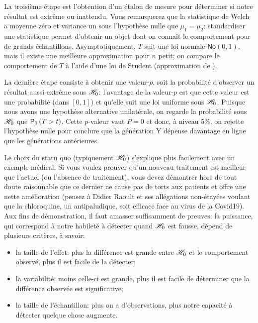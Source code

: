 \documentclass[
  11pt,
  letterpaper,
]{book}
\providecommand{\tightlist}{%
  \setlength{\itemsep}{0pt}\setlength{\parskip}{0pt}}
\begin{document}
La troisième étape est l'obtention d'un étalon de mesure pour déterminer si notre résultat est extrême ou inattendu. Vous remarquerez que la statistique de Welch a moyenne zéro et variance un sous l'hypothèse nulle que \(\mu_1=\mu_2\): standardiser une statistique permet d'obtenir un objet dont on connaît le comportement pour de grands échantillons.
Asymptotiquement, \(T\) suit une loi normale \(\mathsf{No}(0, 1)\), mais il existe une meilleure approximation pour \(n\) petit; on compare le comportement de \(T\) à l'aide d'une loi de Student (approximation de \citet{Satterthwaite:1946}).

La dernière étape consiste à obtenir une valeur-\(p\), soit la probabilité d'observer un résultat aussi extrême sous \(\Hy_0\): l'avantage de la valeur-\(p\) est que cette valeur est une probabilité (dans \([0, 1]\)) et qu'elle suit une loi uniforme sous \(\Hy_0\). Puisque nous avons une hypothèse alternative unilatérale, on regarde la probabilité sous \(\Hy_0\) que \(\pr[0]{T > t}\). Cette \(p\)-valeur vaut \(P=0\) et donc, à niveau 5\%, on rejette l'hypothèse nulle pour conclure que la génération Y dépense davantage en ligne que les générations antérieures.

Le choix du statu quo (typiquement \(\Hy_0\)) s'explique plus facilement avec un exemple médical. Si vous voulez prouver qu'un nouveau traitement est meilleur que l'actuel (ou l'absence de traitement), vous devez démontrer hors de tout doute raisonnable que ce dernier ne cause pas de torts aux patients et offre une nette amélioration (pensez à Didier Raoult et ses allégations non-étayées voulant que la chloroquine, un antipaludique, soit efficace face au virus de la Covid19). Aux fins de démonstration, il faut amasser suffisamment de preuves: la puissance, qui correspond à notre habileté à détecter quand \(\Hy_0\) est fausse, dépend de plusieurs critères, à savoir:

\begin{itemize}
\tightlist
\item
  la taille de l'effet: plus la différence est grande entre \(\Hy_0\) et le comportement observé, plus il est facile de la détecter;
\item
  la variabilité: moins celle-ci est grande, plus il est facile de déterminer que la différence observée est significative;
\item
  la taille de l'échantillon: plus on a d'observations, plus notre capacité à détecter quelque chose augmente.
\end{itemize}
\end{document}
